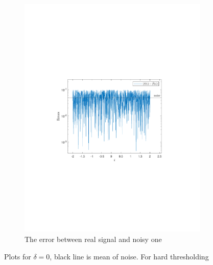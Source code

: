 \documentclass[a4paper]{article}
\begin{document}
\begin{figure}[H]
	\begin{subfigure}{0.49\textwidth}
		\centering
		\includegraphics[trim={4cm 8cm 4cm 8cm},clip,width=1\textwidth]{Images/Delta=0.pdf}
		\caption{The error between real signal and noisy one}
		\label{sub:ErrorD=0}
	\end{subfigure}
	\caption{Plots for $\delta = 0$, black line is mean of noise. For hard thresholding}
	\label{fig:Delta=0}
\end{figure}
\end{document}
